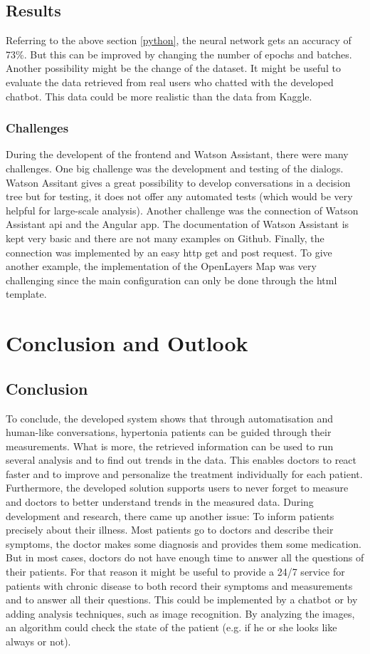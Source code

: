 \section{Results}
Referring to the above section \ref{python}, the neural network gets an accuracy of 73\%. But this can be improved by changing the number of epochs and batches. Another possibility might be the change of the dataset. It might be useful to evaluate the data retrieved from real users who chatted with the developed chatbot. This data could be more realistic than the data from Kaggle.

\subsection{Challenges}
During the developent of the frontend and Watson Assistant, there were many challenges. One big challenge was the development and testing of the dialogs. Watson Assitant gives a great possibility to develop conversations in a decision tree but for testing, it does not offer any automated tests (which would be very helpful for large-scale analysis). 
Another challenge was the connection of Watson Assistant \ac{api} and the Angular app. The documentation of Watson Assistant is kept very basic and there are not many examples on Github. Finally, the connection was implemented by an easy \ac{http} get and post request. 
To give another example, the implementation of the OpenLayers Map was very challenging since the main configuration can only be done through the \ac{html} template. 

\chapter{Conclusion and Outlook}
\section{Conclusion}

To conclude, the developed system shows that through automatisation and human-like conversations, hypertonia patients can be guided through their measurements.
What is more, the retrieved information can be used to run several analysis and to find out trends in the data. This enables doctors to react faster and to improve and personalize the treatment individually for each patient.
Furthermore, the developed solution supports users to never forget to measure and doctors to better understand trends in the measured data.
During development and research, there came up another issue: To inform patients precisely about their illness. Most patients go to doctors and describe their symptoms, the doctor makes some diagnosis and provides them some medication. But in most cases, doctors do not have enough time to answer all the questions of their patients. For that reason it might be useful to provide a 24/7 service for patients with chronic disease to both record their symptoms and measurements and to answer all their questions. This could be implemented by a chatbot or by adding analysis techniques, such as image recognition. By analyzing the images, an algorithm could check the state of the patient (e.g. if he or she looks like always or not). 

